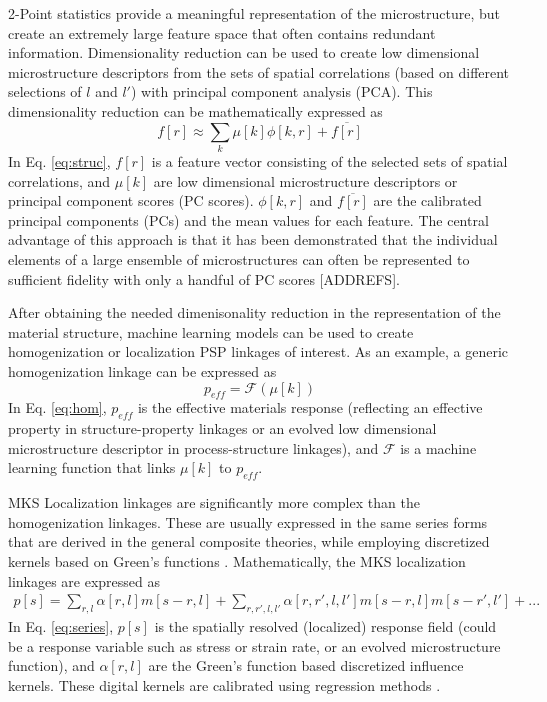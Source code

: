 \documentclass{bmcart}
\begin{document}
2-Point statistics provide a meaningful representation of the microstructure, but create an extremely large feature space that often contains redundant information. Dimensionality reduction can be used to create low dimensional microstructure descriptors from the sets of spatial correlations (based on different selections of $l$ and $l'$) with principal component analysis (PCA). This dimensionality reduction can be mathematically expressed as
\begin{equation} \label{eq:struc}
    f[ r] \approx \sum_{k} \mu[k] \phi[k,  r] + \overline{f[ r]}
\end{equation}
In Eq. \ref{eq:struc}, $f[r]$ is a feature vector consisting of the selected sets of spatial correlations, and $\mu[k]$ are low dimensional microstructure descriptors or principal component scores (PC scores). $\phi[k, r]$ and $\overline{f[r]}$ are the calibrated principal components (PCs) and the mean values for each feature. The central advantage of this approach is that it has been demonstrated that the individual elements of a large ensemble of microstructures can often be represented to sufficient fidelity with only a handful of PC scores [ADDREFS].

After obtaining the needed dimenisonality reduction in the representation of the material structure, machine learning models can be used to create homogenization or localization PSP linkages of interest. As an example, a generic homogenization linkage can be expressed as
\begin{equation} \label{eq:hom}
    p_{eff} = \mathcal{F}(\mu[k])
\end{equation}
 In Eq. \ref{eq:hom}, $p_{eff}$ is the effective materials response (reflecting an effective property in structure-property linkages or an evolved low dimensional microstructure descriptor in process-structure linkages), and $\mathcal{F}$ is a machine learning function that links $\mu[k]$ to $p_{eff}$.

MKS Localization linkages are significantly more complex than the homogenization linkages. These are usually expressed in the same series forms that are derived in the general composite theories, while employing discretized kernels based on Green's functions \cite{brown1955solid, hill1963elastic, kroner1986statistical, kroner1977bounds, kroner1972statistical, etingof1993representations, adams1998mesostructure, fullwood2008strong, torquato2013random, li2006quantitative, milhans2011prediction, adams2013microstructure, garmestani2001statistical}. Mathematically, the MKS localization linkages are expressed as
\begin{multline}
    \label{eq:series}
    p[s] = \sum_{r, l} \alpha[r, l] m[s - r, l] + \sum_{r, r', l, l'} \alpha[r, r', l, l'] m[s - r, l]m[s-r', l'] + ...
\end{multline}
In Eq. \ref{eq:series}, $p[s]$ is the spatially resolved (localized) response field (could be a response variable such as stress or strain rate, or an evolved microstructure function),  and $\alpha[r, l]$ are the Green's function based discretized influence kernels. These digital kernels are calibrated using regression methods \cite{al2012multi, kalidindi2010novel, landi2010multi, yabansu2014calibrated, yabansu2015representation, brough2016microstructure}.
\end{document}
